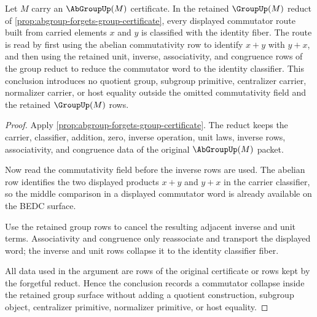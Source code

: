 \begin{theorem}
\label{thm:abgroup-group-reduct-commutativity-centralizes-commutator}
Let $M$ carry an $\AbGroupUp(M)$ certificate. In the retained $\GroupUp(M)$
reduct of \autoref{prop:abgroup-forgets-group-certificate}, every displayed
commutator route built from carried elements $x$ and $y$ is classified with the
identity fiber. The route is read by first using the abelian commutativity row to
identify $x+y$ with $y+x$, and then using the retained unit, inverse,
associativity, and congruence rows of the group reduct to reduce the commutator
word to the identity classifier. This conclusion introduces no quotient group,
subgroup primitive, centralizer carrier, normalizer carrier, or host equality
outside the omitted commutativity field and the retained $\GroupUp(M)$ rows.
\end{theorem}
\begin{proof}
Apply \autoref{prop:abgroup-forgets-group-certificate}. The reduct keeps the
carrier, classifier, addition, zero, inverse operation, unit laws, inverse rows,
associativity, and congruence data of the original $\AbGroupUp(M)$ packet.

Now read the commutativity field before the inverse rows are used. The abelian
row identifies the two displayed products $x+y$ and $y+x$ in the carrier
classifier, so the middle comparison in a displayed commutator word is already
available on the BEDC surface.

Use the retained group rows to cancel the resulting adjacent inverse and unit
terms. Associativity and congruence only reassociate and transport the displayed
word; the inverse and unit rows collapse it to the identity classifier fiber.

All data used in the argument are rows of the original certificate or rows kept
by the forgetful reduct. Hence the conclusion records a commutator collapse
inside the retained group surface without adding a quotient construction,
subgroup object, centralizer primitive, normalizer primitive, or host equality.
\end{proof}


